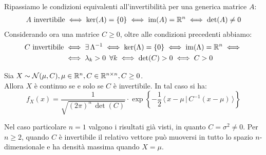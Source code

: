 Ripassiamo le condizioni equivalenti all'invertibilità per una generica matrice $A$:
\Fixvmode
\begin{align*}
  A \text{ invertibile} \iff \ker(A)=\left \{0 \right \} \iff \operatorname{im}(A)=\mathbb R^n \iff \det(A) \ne 0
\end{align*}
Considerando ora una matrice $C \ge 0$, oltre alle condizioni precedenti abbiamo:
\Fixvmode
\begin{align*}
  C \text{ invertibile} &\iff \exists \, \Lambda^{-1} \iff \ker(\Lambda)= \left \{0 \right \} \iff \operatorname{im}(\Lambda)=\mathbb R^n \iff \\
  &\iff \lambda_k>0 \enspace \forall k \iff \det(C)>0 \iff C>0
\end{align*}

\medskip
\begin{teo}
  Sia $X \sim \mathcal N(\mu, C), \mu \in \mathbb R^n, C \in \mathbb R^{n \times n}, C \ge 0$. \\
  Allora $X$ è continuo se e solo se $C$ è invertibile. In tal caso si ha:
  $$f_X(x)=\frac{1}{ \sqrt { (2 \pi)^n \, \det(C)}} \cdot \exp \left \{ - \frac{1}{2} \, \langle \, x-\mu \, | \,C^{-1}(x-\mu) \, \rangle \right \}$$
\end{teo}

Nel caso particolare $n=1$ valgono i risultati già visti, in quanto $C = \sigma^2 \ne 0$.
Per $n \ge 2$, quando $C$ è invertibile il relativo vettore può muoversi in tutto lo spazio $n$-dimensionale e ha densità massima quando $X=\mu$.

